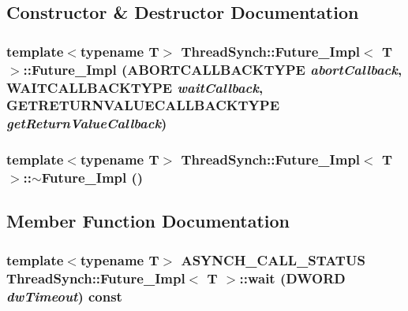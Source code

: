 \subsection{Constructor \& Destructor Documentation}
\subsubsection{\setlength{\rightskip}{0pt plus 5cm}template$<$typename T$>$ {\bf Thread\-Synch::Future\_\-Impl}$<$ T $>$::{\bf Future\_\-Impl} ({\bf ABORTCALLBACKTYPE} {\em abort\-Callback}, {\bf WAITCALLBACKTYPE} {\em wait\-Callback}, {\bf GETRETURNVALUECALLBACKTYPE} {\em get\-Return\-Value\-Callback})\hspace{0.3cm}{\tt  [inline]}}\label{class_thread_synch_1_1_future___impl_456323634b1bed71a9a6570a83e28fb9}


\subsubsection{\setlength{\rightskip}{0pt plus 5cm}template$<$typename T$>$ {\bf Thread\-Synch::Future\_\-Impl}$<$ T $>$::$\sim${\bf Future\_\-Impl} ()\hspace{0.3cm}{\tt  [inline]}}\label{class_thread_synch_1_1_future___impl_cd9b1d61ee447493d12152d4ed95b5d7}




\subsection{Member Function Documentation}
\subsubsection{\setlength{\rightskip}{0pt plus 5cm}template$<$typename T$>$ {\bf ASYNCH\_\-CALL\_\-STATUS} {\bf Thread\-Synch::Future\_\-Impl}$<$ T $>$::wait (DWORD {\em dw\-Timeout}) const\hspace{0.3cm}{\tt  [inline]}}\label{class_thread_synch_1_1_future___impl_b04bb40760009b462d960998159e4b01}


